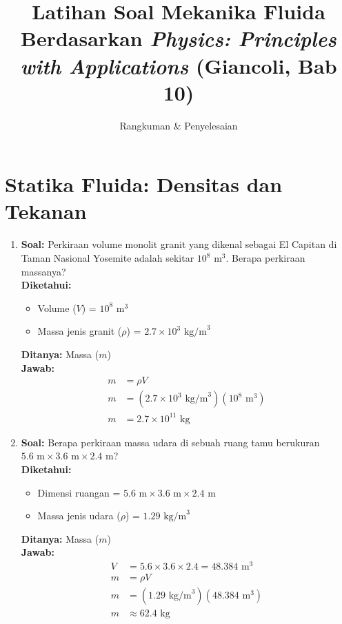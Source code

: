 \documentclass[twocolumn]{article}
\title{Latihan Soal Mekanika Fluida \\ \large Berdasarkan \textit{Physics: Principles with Applications} (Giancoli, Bab 10)}
\author{Rangkuman \& Penyelesaian}
\date{}
\begin{document}
\maketitle

\section*{Statika Fluida: Densitas dan Tekanan}

\begin{enumerate}

    \item \textbf{Soal:} Perkiraan volume monolit granit yang dikenal sebagai El Capitan di Taman Nasional Yosemite adalah sekitar $10^8 \text{ m}^3$. Berapa perkiraan massanya? \\
    \textbf{Diketahui:}
    \begin{itemize}
        \item Volume ($V$) = $10^8 \text{ m}^3$
        \item Massa jenis granit ($\rho$) = $2.7 \times 10^3 \text{ kg/m}^3$
    \end{itemize}
    \textbf{Ditanya:} Massa ($m$) \\
    \textbf{Jawab:}
    \begin{align*}
        m &= \rho V \\
        m &= (2.7 \times 10^3 \text{ kg/m}^3)(10^8 \text{ m}^3) \\
        m &= 2.7 \times 10^{11} \text{ kg}
    \end{align*}

    \item \textbf{Soal:} Berapa perkiraan massa udara di sebuah ruang tamu berukuran $5.6 \text{ m} \times 3.6 \text{ m} \times 2.4 \text{ m}$? \\
    \textbf{Diketahui:}
    \begin{itemize}
        \item Dimensi ruangan = $5.6 \text{ m} \times 3.6 \text{ m} \times 2.4 \text{ m}$
        \item Massa jenis udara ($\rho$) = $1.29 \text{ kg/m}^3$
    \end{itemize}
    \textbf{Ditanya:} Massa ($m$) \\
    \textbf{Jawab:}
    \begin{align*}
        V &= 5.6 \times 3.6 \times 2.4 = 48.384 \text{ m}^3 \\
        m &= \rho V \\
        m &= (1.29 \text{ kg/m}^3)(48.384 \text{ m}^3) \\
        m &\approx 62.4 \text{ kg}
    \end{align*}


\end{enumerate}
\end{document}
